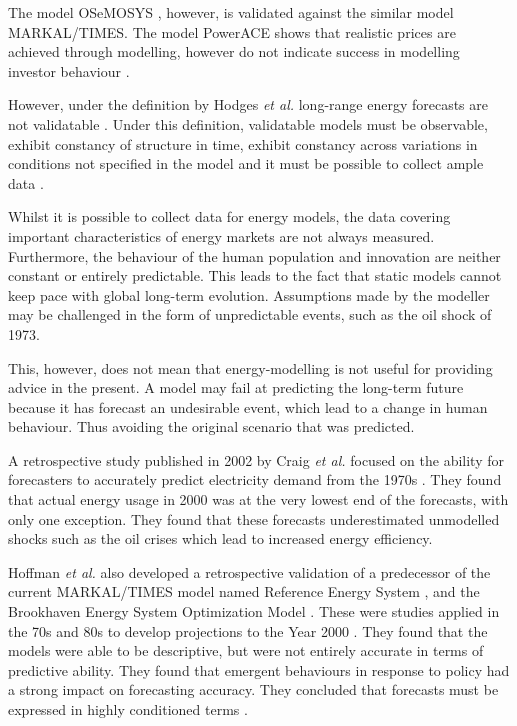 \documentclass[final,3p,times,twocolumn,numbers]{elsarticle}
\begin{document}
The model OSeMOSYS \cite{Howells2011}, however, is validated against the similar model MARKAL\slash TIMES. The model PowerACE shows that realistic prices are achieved through modelling, however do not indicate success in modelling investor behaviour \cite{Ringler2012}.

However, under the definition by Hodges \textit{et al.} \cite{Hodges} long-range energy forecasts are not validatable \cite{Craig2002}. Under this definition, validatable models must be observable, exhibit constancy of structure in time, exhibit constancy across variations in conditions not specified in the model and it must be possible to collect ample data \cite{Hodges}.

Whilst it is possible to collect data for energy models, the data covering important characteristics of energy markets are not always measured. Furthermore, the behaviour of the human population and innovation are neither constant or entirely predictable. This leads to the fact that static models cannot keep pace with global long-term evolution. Assumptions made by the modeller may be challenged in the form of unpredictable events, such as the oil shock of 1973.

This, however, does not mean that energy-modelling is not useful for providing advice in the present. A model may fail at predicting the long-term future because it has forecast an undesirable event, which lead to a change in human behaviour. Thus avoiding the original scenario that was predicted.

A retrospective study published in 2002 by Craig \textit{et al.} focused on the ability for forecasters to accurately predict electricity demand from the 1970s \cite{Craig2002}. They found that actual energy usage in 2000 was at the very lowest end of the forecasts, with only one exception. They found that these forecasts underestimated unmodelled shocks such as the oil crises which lead to increased energy efficiency.

Hoffman \textit{et al.} also developed a retrospective validation of a predecessor of the current MARKAL\slash TIMES model named Reference Energy System \cite{Hoffman_1973}, and the Brookhaven Energy System Optimization Model \cite{ERDA_48}. These were studies applied in the 70s and 80s to develop projections to the Year 2000 . They found that the models were able to be descriptive, but were not entirely accurate in terms of predictive ability. They found that emergent behaviours in response to policy had a strong impact on forecasting accuracy. They concluded that forecasts must be expressed in highly conditioned terms \cite{Hoffman2011}. 
\end{document}
